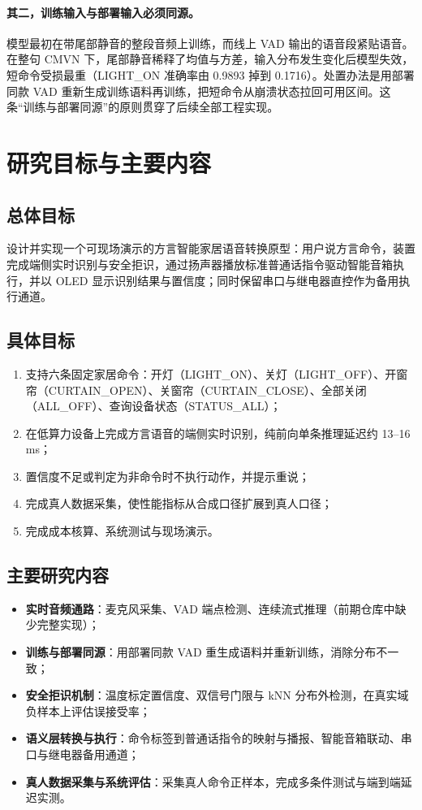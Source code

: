 \documentclass[UTF8,a4paper,12pt,fontset=fandol]{ctexart}
\begin{document}
\paragraph{其二，训练输入与部署输入必须同源。}
模型最初在带尾部静音的整段音频上训练，而线上 VAD 输出的语音段紧贴语音。在整句 CMVN 下，尾部静音稀释了均值与方差，输入分布发生变化后模型失效，短命令受损最重（LIGHT\_ON 准确率由 0.9893 掉到 0.1716）。处置办法是用部署同款 VAD 重新生成训练语料再训练，把短命令从崩溃状态拉回可用区间。这条“训练与部署同源”的原则贯穿了后续全部工程实现。

\section{研究目标与主要内容}

\subsection{总体目标}

设计并实现一个可现场演示的方言智能家居语音转换原型：用户说方言命令，装置完成端侧实时识别与安全拒识，通过扬声器播放标准普通话指令驱动智能音箱执行，并以 OLED 显示识别结果与置信度；同时保留串口与继电器直控作为备用执行通道。

\subsection{具体目标}

\begin{enumerate}[leftmargin=2em]
  \item 支持六条固定家居命令：开灯（LIGHT\_ON）、关灯（LIGHT\_OFF）、开窗帘（CURTAIN\_OPEN）、关窗帘（CURTAIN\_CLOSE）、全部关闭（ALL\_OFF）、查询设备状态（STATUS\_ALL）；
  \item 在低算力设备上完成方言语音的端侧实时识别，纯前向单条推理延迟约 13--16 ms；
  \item 置信度不足或判定为非命令时不执行动作，并提示重说；
  \item 完成真人数据采集，使性能指标从合成口径扩展到真人口径；
  \item 完成成本核算、系统测试与现场演示。
\end{enumerate}

\subsection{主要研究内容}

\begin{itemize}[leftmargin=2em]
  \item \textbf{实时音频通路}：麦克风采集、VAD 端点检测、连续流式推理（前期仓库中缺少完整实现）；
  \item \textbf{训练与部署同源}：用部署同款 VAD 重生成语料并重新训练，消除分布不一致；
  \item \textbf{安全拒识机制}：温度标定置信度、双信号门限与 kNN 分布外检测，在真实域负样本上评估误接受率；
  \item \textbf{语义层转换与执行}：命令标签到普通话指令的映射与播报、智能音箱联动、串口与继电器备用通道；
  \item \textbf{真人数据采集与系统评估}：采集真人命令正样本，完成多条件测试与端到端延迟实测。
\end{itemize}
\end{document}
